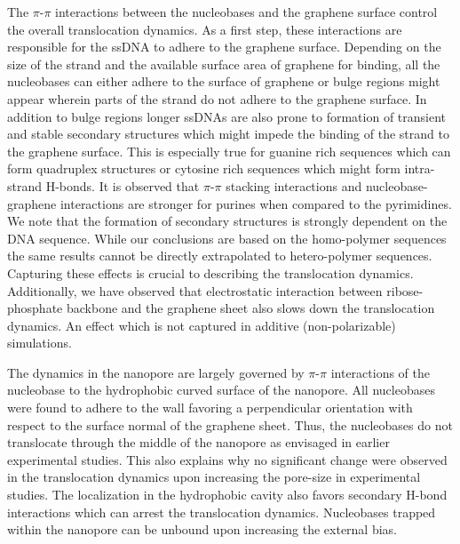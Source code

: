 The $\pi$-$\pi$ interactions between the nucleobases and the graphene surface control the overall translocation dynamics. As a first step, these interactions are responsible for the ssDNA to adhere to the graphene surface. Depending on the size of the strand and the available surface area of graphene for binding, all the nucleobases can either adhere to the surface of graphene or bulge regions might appear wherein parts of the strand do not adhere to the graphene surface.\supercite{varghese_binding_2009, iliafar_quantifying_2012, manohar_peeling_2008, ranganathan_complex_2016} In addition to bulge regions longer ssDNAs are also prone to formation of transient and stable secondary structures which might impede the binding of the strand to the graphene surface. This is especially true for guanine rich sequences which can form quadruplex structures\supercite{spiegel_structure_2020} or cytosine rich sequences which might form intra-strand H-bonds\supercite{berger_inter-strand_1996}. It is observed that $\pi$-$\pi$ stacking interactions and nucleobase-graphene interactions are stronger for purines when compared to the pyrimidines. We note that the formation of secondary structures is strongly dependent on the DNA sequence. While our conclusions are based on the homo-polymer sequences the same results cannot be directly extrapolated to hetero-polymer sequences. Capturing these effects is crucial to describing the translocation dynamics. Additionally, we have observed that electrostatic interaction between ribose-phosphate backbone and the graphene sheet also slows down the translocation dynamics. An effect which is not captured in additive (non-polarizable) simulations. 

The dynamics in the nanopore are largely governed by $\pi$-$\pi$ interactions of the nucleobase to the hydrophobic curved surface of the nanopore. All nucleobases were found to adhere to the wall favoring a perpendicular orientation with respect to the surface normal of the graphene sheet. Thus, the nucleobases do not translocate through the middle of the nanopore as envisaged in earlier experimental studies. This also explains why no significant change were observed in the translocation dynamics upon increasing the pore-size\supercite{garaj_graphene_2010,merchant_dna_2010, schneider_dna_2010, schneider_tailoring_2013} in experimental studies. The localization in the hydrophobic cavity also favors secondary H-bond interactions which can arrest the translocation dynamics. Nucleobases trapped within the nanopore can be unbound upon increasing the external bias. 

